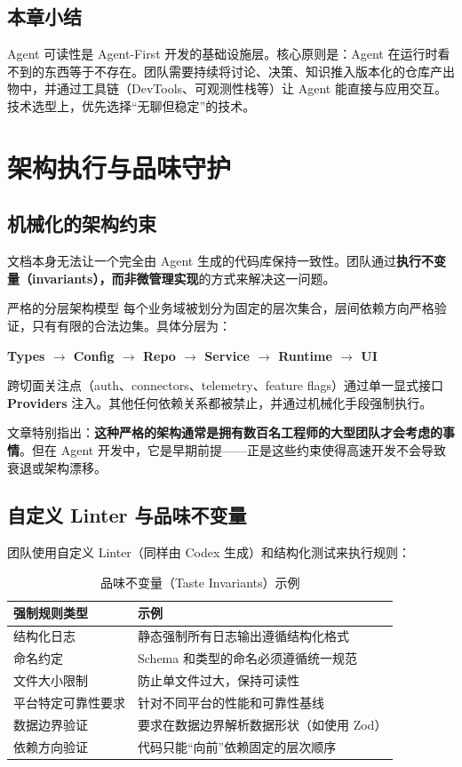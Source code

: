 \documentclass[a4paper]{article}
\begin{document}
\subsection{本章小结}

Agent 可读性是 Agent-First 开发的基础设施层。核心原则是：Agent 在运行时看不到的东西等于不存在。团队需要持续将讨论、决策、知识推入版本化的仓库产出物中，并通过工具链（DevTools、可观测性栈等）让 Agent 能直接与应用交互。技术选型上，优先选择``无聊但稳定''的技术。

\newpage

\section{架构执行与品味守护}

\subsection{机械化的架构约束}

文档本身无法让一个完全由 Agent 生成的代码库保持一致性。团队通过\textbf{执行不变量（invariants），而非微管理实现}的方式来解决这一问题。

\begin{importantbox}{严格的分层架构模型}
每个业务域被划分为固定的层次集合，层间依赖方向严格验证，只有有限的合法边集。具体分层为：

\textbf{Types $\rightarrow$ Config $\rightarrow$ Repo $\rightarrow$ Service $\rightarrow$ Runtime $\rightarrow$ UI}

跨切面关注点（auth、connectors、telemetry、feature flags）通过单一显式接口 \textbf{Providers} 注入。其他任何依赖关系都被禁止，并通过机械化手段强制执行。
\end{importantbox}

文章特别指出：\textbf{这种严格的架构通常是拥有数百名工程师的大型团队才会考虑的事情}。但在 Agent 开发中，它是早期前提——正是这些约束使得高速开发不会导致衰退或架构漂移。

\subsection{自定义 Linter 与品味不变量}

团队使用自定义 Linter（同样由 Codex 生成）和结构化测试来执行规则：

\begin{table}[H]
\centering
\small
\begin{tabular}{p{4.5cm}p{8.5cm}}
\toprule
\textbf{强制规则类型} & \textbf{示例} \\
\midrule
结构化日志 & 静态强制所有日志输出遵循结构化格式 \\
命名约定 & Schema 和类型的命名必须遵循统一规范 \\
文件大小限制 & 防止单文件过大，保持可读性 \\
平台特定可靠性要求 & 针对不同平台的性能和可靠性基线 \\
数据边界验证 & 要求在数据边界解析数据形状（如使用 Zod） \\
依赖方向验证 & 代码只能``向前''依赖固定的层次顺序 \\
\bottomrule
\end{tabular}
\caption{品味不变量（Taste Invariants）示例}
\end{table}
\end{document}
